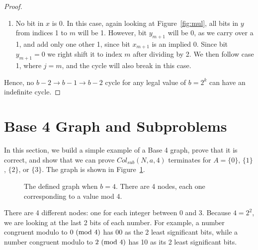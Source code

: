 \begin{proof}
\begin{enumerate}
    \item No bit in $x$ is 0. In this case, again looking at Figure~\ref{fig:mul}, all bits in $y$ from indices 1 to $m$ will be 1. However, bit $y_{m+1}$ will be 0, as we carry over a 1, and add only one other 1, since bit $x_{m+1}$ is an implied 0. Since bit $y_{m+1} = 0$ we right shift it to index $m$ after dividing by 2. We then follow case 1, where $j = m$, and the cycle will also break in this case.
 \end{enumerate}
 Hence, no $b-2 \rightarrow b-1 \rightarrow b-2$ cycle for any legal value of $b = 2^k$ can have an indefinite cycle. 
\end{proof}
\section{Base 4 Graph and Subproblems} \label{subsec:base4graph}
In this section, we build a simple example of a Base 4 graph, prove that it is correct, and show that we can prove $Col_{sub}(N,a,4)$ terminates
for $A = \{0\}$, $\{1\}$, $\{2\}$, or $\{3\}$. The graph is shown in Figure~\ref{fig:base_4_graph}. \par
\begin{figure}
    \centering
    \caption{The defined graph when $b = 4$. There are 4 nodes, each one corresponding to a value mod 4.}
    \label{fig:base_4_graph}
\end{figure}
There are 4 different nodes: one for each integer between 0 and 3. Because $4 = 2^2$, we are looking at the last 2 bits of each number. For example, a number congruent modulo to $0\ (\mathrm{mod}\ 4)$ has 00 as the 2 least significant bits, while a number congruent modulo to $2\ (\mathrm{mod}\ 4)$ has 10 as its 2 least significant bits. 
